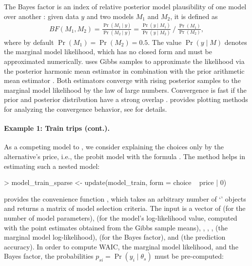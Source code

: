 \documentclass[article,shortnames]{jss}
\newcommand{\class}[1]{`\code{#1}'}
\newcommand{\fct}[1]{\code{#1()}}
\begin{document}
The Bayes factor is an index of relative posterior model plausibility of one model over another \citep{Marin:2014}: given data $y$ and two models $M_1$ and $M_2$, it is defined as
%
\begin{align*}
BF(M_1,M_2) = \frac{\Pr(M_1 \mid y)}{\Pr(M_2 \mid y)} = \frac{\Pr(y \mid M_1 )}{\Pr(y \mid M_2)}~/~\frac{\Pr(M_1)}{\Pr(M_2)},
\end{align*}
%
where by default $\Pr(M_1) = \Pr(M_2) = 0.5$. The value $\Pr(y \mid M)$ denotes the marginal model likelihood, which has no closed form and must be approximated numerically.  uses Gibbs samples to approximate the likelihood via the posterior harmonic mean estimator \citep{Newton:1994} in combination with the prior arithmetic mean estimator \citep{Hammersley:1964}. Both estimators converge with rising posterior samples to the marginal model likelihood by the law of large numbers. Convergence is fast if the prior and posterior distribution have a strong overlap \citep{Gronau:2017}.  provides plotting methods for analyzing the convergence behavior, see  for details.

\paragraph{Example 1: Train trips (cont.).}

As a competing model to , we consider explaining the choices only by the alternative's price, i.e., the probit model with the formula . The \fct{update} method helps in estimating such a nested model:

\begin{Schunk}
\begin{Sinput}
> model_train_sparse <- update(model_train, form = choice ~ price | 0)
\end{Sinput}
\end{Schunk}

 provides the convenience function \fct{model\_selection}, which takes an arbitrary number of \class{RprobitB\_fit} objects and returns a matrix of model selection criteria. The  input is a vector of  (for the number of model parameters),  (for the model's log-likelihood value, computed with the point estimates obtained from the Gibbs sample means), , , ,  (the marginal model log-likelihood),  (for the Bayes factor), and  (the prediction accuracy). In order to compute WAIC, the marginal model likelihood, and the Bayes factor, the probabilities $p_{si} = \Pr(y_i\mid \theta_s)$ must be pre-computed:
\end{document}
